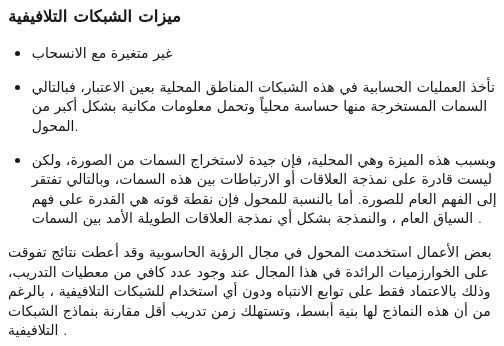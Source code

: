 \subsubsection{ميزات الشبكات التلافيفية}
\begin{itemize}
\item
غير متغيرة مع الانسحاب
\item
تأخذ العمليات الحسابية في هذه الشبكات المناطق المحلية بعين الاعتبار، فبالتالي السمات المستخرجة منها حساسة محلياً وتحمل معلومات مكانية بشكل أكبر من المحول.
\item
وبسبب هذه الميزة وهي المحلية،
فإن
جيدة لاستخراج السمات من الصورة، ولكن ليست قادرة على نمذجة العلاقات أو الارتباطات بين هذه السمات، وبالتالي تفتقر إلى الفهم العام للصورة. أما بالنسبة للمحول فإن نقطة قوته هي القدرة على فهم السياق العام
،
والنمذجة بشكل
أي نمذجة العلاقات الطويلة الأمد بين السمات
.
\end{itemize}
بعض الأعمال استخدمت المحول في مجال الرؤية الحاسوبية وقد أعطت نتائج تفوقت على الخوارزميات الرائدة في هذا المجال عند وجود عدد كافي من معطيات التدريب، وذلك بالاعتماد فقط على توابع الانتباه ودون أي استخدام للشبكات التلافيفية 
،
بالرغم من أن هذه النماذج لها بنية أبسط، وتستهلك زمن تدريب أقل مقارنة بنماذج الشبكات التلافيفية
.
